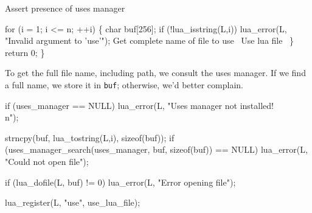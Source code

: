     \LA{}Assert presence of uses manager~{\nwtagstyle{}}\RA{}

    for (i = 1; i <= n; ++i) \{
        char buf[256];
        if (!lua_isstring(L,i))
            lua_error(L, "Invalid argument to 'use'");
        \LA{}Get complete name of file to use~{\nwtagstyle{}}\RA{}
        \LA{}Use lua file~{\nwtagstyle{}}\RA{}
    \}
    return 0;
\}

\nwendcode{}\nwdocspar

To get the full file name, including path, we consult 
the uses manager.  If we find a full name, we store it in {\tt{}buf};
otherwise, we'd better complain.

\nwenddocs{}\endmoddef
if (uses_manager == NULL)
    lua_error(L, "Uses manager not installed!\\n");
\nwendcode{}\nwdocspar

\nwenddocs{}\endmoddef
strncpy(buf, lua_tostring(L,i), sizeof(buf));
if (uses_manager_search(uses_manager, buf, sizeof(buf)) == NULL)
    lua_error(L, "Could not open file");
\nwendcode{}\nwdocspar

\nwenddocs{}\endmoddef
if (lua_dofile(L, buf) != 0)
    lua_error(L, "Error opening file");
\nwendcode{}\nwdocspar

\nwenddocs{}\endmoddef
lua_register(L, "use", use_lua_file);
\nwendcode{}\nwdocspar


